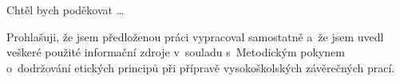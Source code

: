 \documentclass[czech,master,twoside]{ctufit-thesis}
\begin{document}
\frontmatter\frontmatterinit

\thispagestyle{empty}\maketitle\thispagestyle{empty}\cleardoublepage

% 

\imprintpage
\stopTOCentries

\begin{acknowledgmentpage}
	Chtěl bych poděkovat \ldots
\end{acknowledgmentpage}

\begin{declarationpage}
	Prohlašuji, že jsem předloženou práci vypracoval samostatně a~že jsem uvedl veškeré použité informační zdroje v~souladu s~Metodickým pokynem o~dodržování etických principů při přípravě vysokoškolských závěrečných prací.
\end{declarationpage}

\printtwopageabstract

\chapter{\thectufitabbreviationlabel}
\end{document}
